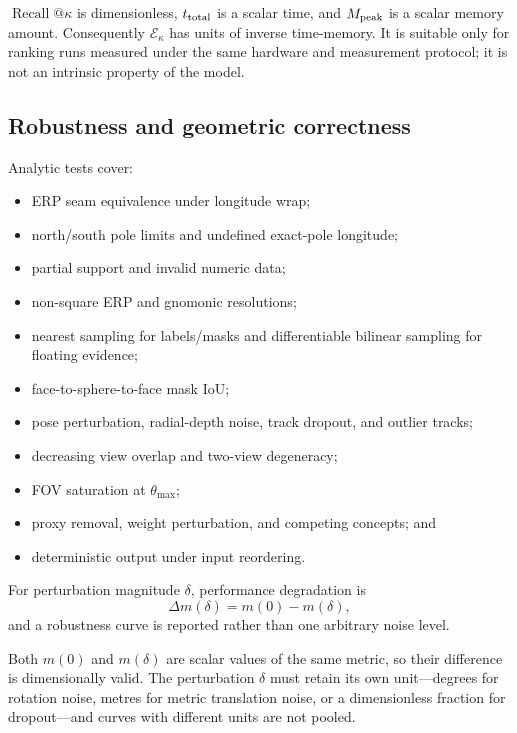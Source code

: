 \documentclass[a4paper,9pt]{extarticle}
\begin{document}
$\operatorname{Recall}@\kappa$ is dimensionless, $t_{\rm total}$ is a scalar
time, and $M_{\rm peak}$ is a scalar memory amount. Consequently
$\mathcal E_\kappa$ has units of inverse time-memory. It is suitable only for
ranking runs measured under the same hardware and measurement protocol; it is
not an intrinsic property of the model.

\subsection{Robustness and geometric correctness}

Analytic tests cover:
\begin{itemize}
 \item ERP seam equivalence under longitude wrap;
 \item north/south pole limits and undefined exact-pole longitude;
 \item partial support and invalid numeric data;
 \item non-square ERP and gnomonic resolutions;
 \item nearest sampling for labels/masks and differentiable bilinear sampling for floating evidence;
 \item face-to-sphere-to-face mask IoU;
 \item pose perturbation, radial-depth noise, track dropout, and outlier tracks;
 \item decreasing view overlap and two-view degeneracy;
 \item FOV saturation at $\theta_{\max}$;
 \item proxy removal, weight perturbation, and competing concepts; and
 \item deterministic output under input reordering.
\end{itemize}

For perturbation magnitude $\delta$, performance degradation is
\begin{equation}
 \Delta m(\delta)=m(0)-m(\delta),
 \label{eq:robustness}
\end{equation}
and a robustness curve is reported rather than one arbitrary noise level.

Both $m(0)$ and $m(\delta)$ are scalar values of the same metric, so their
difference is dimensionally valid. The perturbation $\delta$ must retain its
own unit---degrees for rotation noise, metres for metric translation noise, or
a dimensionless fraction for dropout---and curves with different units are not
pooled.
\end{document}
